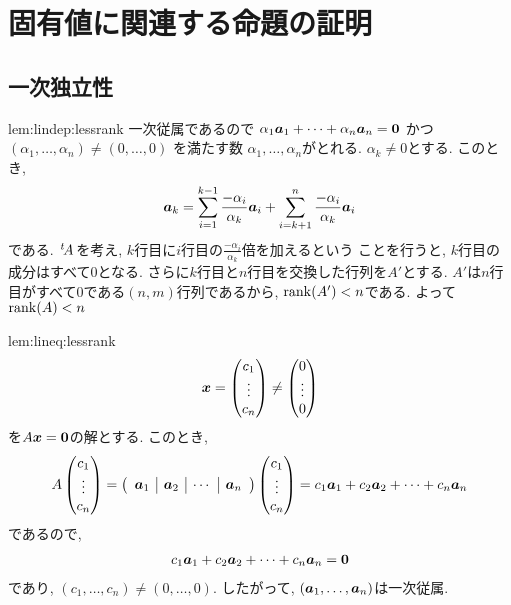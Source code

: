 \section{固有値に関連する命題の証明}
\subsection{一次独立性}
\begin{proofof}{lem:lindep:lessrank}
  一次従属であるので
  $\alpha_1\boldsymbol{a}_1+\cdots+\alpha_n\boldsymbol{a}_n=\boldsymbol{0}$
  かつ$(\alpha_1,\ldots,\alpha_n)\neq (0,\ldots,0)$
  を満たす数
  $\alpha_1,\ldots,\alpha_n$がとれる.
  $\alpha_k\neq 0$とする.
  このとき,
  \begin{align*}
    \boldsymbol{a}_k=\sum_{i=1}^{k-1}\frac{-\alpha_i}{\alpha_k}\boldsymbol{a}_i
    +\sum_{i=k+1}^{n}\frac{-\alpha_i}{\alpha_k}\boldsymbol{a}_i
  \end{align*}
  である.
  ${\left.^{t}\!A\right.}$を考え,
  $k$行目に$i$行目の$\frac{-\alpha_i}{\alpha_k}$倍を加えるという
  ことを行うと, $k$行目の成分はすべて$0$となる.
  さらに$k$行目と$n$行目を交換した行列を$A'$とする.
  $A'$は$n$行目がすべて0である$(n,m)$行列であるから, $\operatorname{rank}(A')<n$である.
  よって$\operatorname{rank}(A)<n$
\end{proofof}
\begin{proofof}{lem:lineq:lessrank}
  \begin{align*}
    \boldsymbol{x}=\begin{pmatrix}c_1\\\vdots\\c_n\end{pmatrix}\neq
    \begin{pmatrix}0\\\vdots\\0\end{pmatrix}
  \end{align*}
  を$A\boldsymbol{x}=\boldsymbol{0}$の解とする.
  このとき,
  \begin{align*}
    A\begin{pmatrix}c_1\\\vdots\\c_n\end{pmatrix}
    =
    \left(\begin{array}{c|c|c|c}\boldsymbol{a}_1&\boldsymbol{a}_2&\cdots&\boldsymbol{a}_n\end{array}\right)
      \begin{pmatrix}c_1\\\vdots\\c_n\end{pmatrix}
        =
        c_1\boldsymbol{a}_1+c_2\boldsymbol{a}_2+\cdots+c_n\boldsymbol{a}_n
  \end{align*}
  であるので,
  \begin{align*}
    c_1\boldsymbol{a}_1+c_2\boldsymbol{a}_2+\cdots+c_n\boldsymbol{a}_n=\boldsymbol{0}
  \end{align*}
  であり, $(c_1,\ldots,c_n)\neq (0,\ldots,0)$.
  したがって,
  $(\boldsymbol{a}_1,\ldots,\boldsymbol{a}_n)$は一次従属.
\end{proofof}

